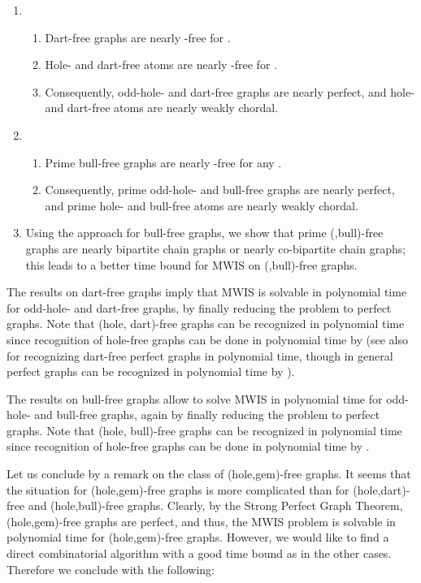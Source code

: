 \documentclass[11pt]{article}
\newcommand{\0}{\text{ has a co-join to }}
\newcommand{\1}{\text{ has a join to }}
\begin{document}
\begin{enumerate}
\item 
\begin{enumerate}
\item Dart-free graphs are nearly -free for . 
\item Hole- and dart-free atoms are nearly -free for .
\item Consequently, odd-hole- and dart-free graphs are nearly perfect, and hole- and dart-free atoms are nearly weakly chordal.  
\end{enumerate}

\item 
\begin{enumerate}
\item Prime bull-free graphs are nearly -free for any .
\item Consequently, prime odd-hole- and bull-free graphs are nearly perfect, and prime hole- and bull-free atoms are nearly weakly chordal. 
\end{enumerate}

\item Using the approach for bull-free graphs, we show that prime (,bull)-free graphs are nearly bipartite chain graphs or nearly co-bipartite chain graphs; this leads to a better time bound for MWIS on (,bull)-free graphs.  
\end{enumerate}

The results on dart-free graphs imply that MWIS is solvable in polynomial time for odd-hole- and dart-free graphs, by finally reducing the problem to perfect graphs. Note that (hole, dart)-free graphs can be recognized in polynomial time since recognition of hole-free graphs can be done in polynomial time by \cite{Spinrad1991} (see also \cite{ChvFonSunZem2002} for recognizing dart-free perfect graphs in polynomial time, though in general perfect graphs can be recognized in polynomial time by \cite{ChuCorLiuSeyVus2005,CorLiuVus2003}).

\medskip

The results on bull-free graphs allow to solve MWIS in polynomial time for odd-hole- and bull-free graphs, again by finally reducing the problem to perfect graphs. Note that (hole, bull)-free graphs can be recognized in polynomial time since recognition of hole-free graphs can be done in polynomial time by \cite{Spinrad1991}. 

\medskip

Let us conclude by a remark on the class of (hole,gem)-free graphs. It seems that the situation for (hole,gem)-free graphs is more complicated than for (hole,dart)-free and (hole,bull)-free graphs. Clearly, by the Strong Perfect Graph Theorem, (hole,gem)-free graphs are perfect, and thus, the MWIS problem is solvable in polynomial time for (hole,gem)-free graphs. However, we would like to find a direct combinatorial algorithm with a good time bound as in the other cases. Therefore we conclude with the following: 
\end{document}
